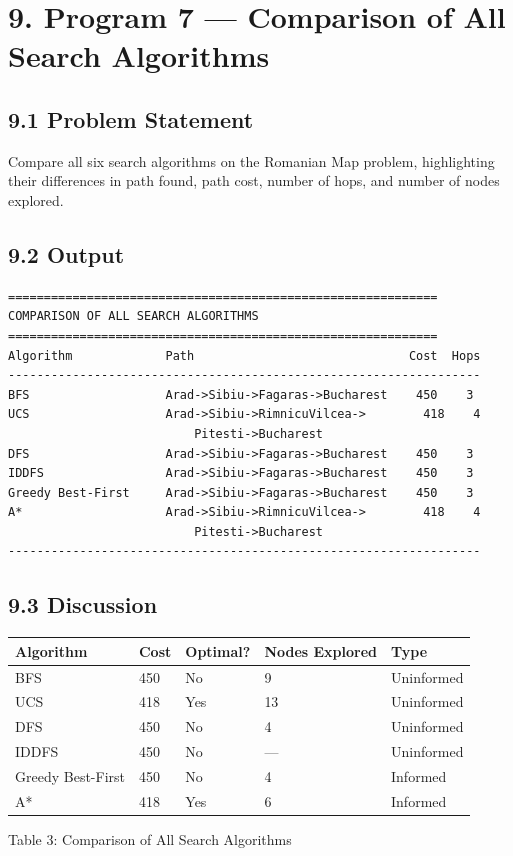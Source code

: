 \documentclass[12pt,a4paper]{article}
\begin{document}
\section*{9. Program 7 --- Comparison of All Search Algorithms}

\subsection*{9.1 Problem Statement}

Compare all six search algorithms on the Romanian Map problem, highlighting their differences in path found, path cost, number of hops, and number of nodes explored.

\subsection*{9.2 Output}

\begin{verbatim}
============================================================
COMPARISON OF ALL SEARCH ALGORITHMS
============================================================
Algorithm             Path                              Cost  Hops
------------------------------------------------------------------
BFS                   Arad->Sibiu->Fagaras->Bucharest    450    3
UCS                   Arad->Sibiu->RimnicuVilcea->        418    4
                          Pitesti->Bucharest
DFS                   Arad->Sibiu->Fagaras->Bucharest    450    3
IDDFS                 Arad->Sibiu->Fagaras->Bucharest    450    3
Greedy Best-First     Arad->Sibiu->Fagaras->Bucharest    450    3
A*                    Arad->Sibiu->RimnicuVilcea->        418    4
                          Pitesti->Bucharest
------------------------------------------------------------------
\end{verbatim}

\subsection*{9.3 Discussion}

\begin{center}
\begin{tabular}{@{}lllll@{}}
\toprule
\textbf{Algorithm} & \textbf{Cost} & \textbf{Optimal?} & \textbf{Nodes Explored} & \textbf{Type} \\
\midrule
BFS               & 450 & No  & 9  & Uninformed \\
UCS               & 418 & Yes & 13 & Uninformed \\
DFS               & 450 & No  & 4  & Uninformed \\
IDDFS             & 450 & No  & --- & Uninformed \\
Greedy Best-First & 450 & No  & 4  & Informed \\
A*                & 418 & Yes & 6  & Informed \\
\bottomrule
\end{tabular}
\end{center}
\begin{center}
\small Table 3: Comparison of All Search Algorithms
\end{center}
\end{document}
